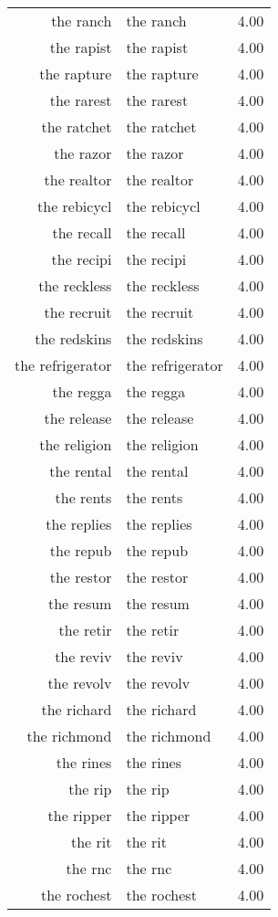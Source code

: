 \begin{table}[ht]
\begin{tabular}{rlr}
  the ranch & the ranch & 4.00 \\ 
  the rapist & the rapist & 4.00 \\ 
  the rapture & the rapture & 4.00 \\ 
  the rarest & the rarest & 4.00 \\ 
  the ratchet & the ratchet & 4.00 \\ 
  the razor & the razor & 4.00 \\ 
  the realtor & the realtor & 4.00 \\ 
  the rebicycl & the rebicycl & 4.00 \\ 
  the recall & the recall & 4.00 \\ 
  the recipi & the recipi & 4.00 \\ 
  the reckless & the reckless & 4.00 \\ 
  the recruit & the recruit & 4.00 \\ 
  the redskins & the redskins & 4.00 \\ 
  the refrigerator & the refrigerator & 4.00 \\ 
  the regga & the regga & 4.00 \\ 
  the release & the release & 4.00 \\ 
  the religion & the religion & 4.00 \\ 
  the rental & the rental & 4.00 \\ 
  the rents & the rents & 4.00 \\ 
  the replies & the replies & 4.00 \\ 
  the repub & the repub & 4.00 \\ 
  the restor & the restor & 4.00 \\ 
  the resum & the resum & 4.00 \\ 
  the retir & the retir & 4.00 \\ 
  the reviv & the reviv & 4.00 \\ 
  the revolv & the revolv & 4.00 \\ 
  the richard & the richard & 4.00 \\ 
  the richmond & the richmond & 4.00 \\ 
  the rines & the rines & 4.00 \\ 
  the rip & the rip & 4.00 \\ 
  the ripper & the ripper & 4.00 \\ 
  the rit & the rit & 4.00 \\ 
  the rnc & the rnc & 4.00 \\ 
  the rochest & the rochest & 4.00 \\ 

\end{tabular}
\end{table}
